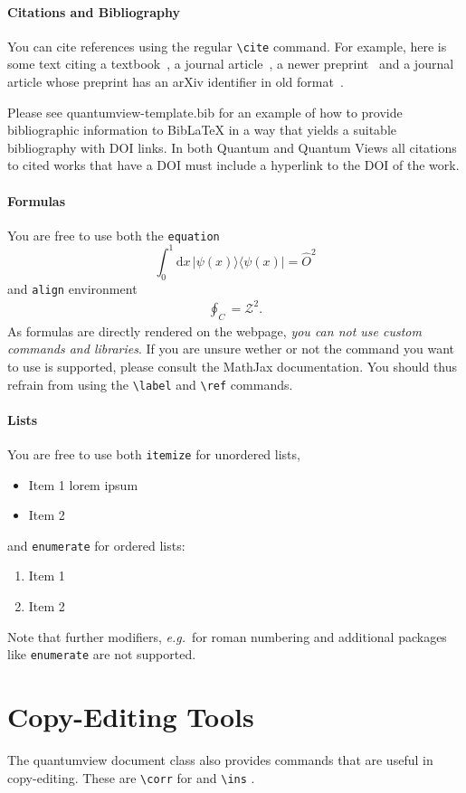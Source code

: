\documentclass{quantumview}
\begin{document}
\paragraph{Citations and Bibliography} You can cite references using the regular \texttt{{\textbackslash}cite} command. For example, here is some text citing a textbook~\cite{NielsenChuang2000}, a journal article~\cite{Preskill2018}, a newer preprint~\cite{SchwarzhansLockErkerFriisHuber2020} and a journal article whose preprint has an arXiv identifier in old format~\cite{AcinBrussLewensteinSanpera2001}.

Please see quantumview-template.bib for an example of how to provide bibliographic information to BibLaTeX in a way that yields a suitable bibliography with DOI links.
In both Quantum and Quantum Views all citations to cited works that have a DOI must include a hyperlink to the DOI of the work.

\paragraph{Formulas} You are free to use both the \texttt{equation}
\begin{equation}
    \int_0^1 \mathrm{d}x \, |\psi(x)\rangle \! \langle \psi(x)|= \hat{O}^2
\end{equation}
and \texttt{align} environment
\begin{align}
    \oint_C = \mathcal{Z}^2.
\end{align}
As formulas are directly rendered on the webpage, \emph{you can not use custom commands and libraries}. If you are unsure wether or not the command you want to use is supported, please consult the MathJax documentation. You should thus refrain from using the \texttt{{\textbackslash}label} and \texttt{{\textbackslash}ref} commands.

\paragraph{Lists} You are free to use both \texttt{itemize} for unordered lists,
\begin{itemize}
    \item Item 1 lorem ipsum
    \item Item 2
\end{itemize}
and \texttt{enumerate} for ordered lists:
\begin{enumerate}
    \item Item 1
    \item Item 2
\end{enumerate}
Note that further modifiers, \emph{e.g.}\ for roman numbering and additional packages like \texttt{enumerate} are not supported.

\section{Copy-Editing Tools}
The quantumview document class also provides commands that are useful in copy-editing. These are \texttt{{\textbackslash}corr} for  and \texttt{{\textbackslash}ins} .



\end{document}
